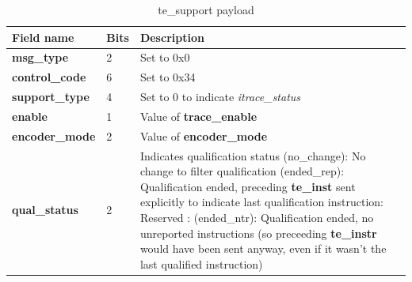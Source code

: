 \begin{table}[!h]
    \centering
    \caption{te\_support payload}
    \label{tab:te_support}
    \begin{tabulary}{\textwidth}{|l|p{8mm}|p{80mm}|}
        \hline
        \textbf {Field name} & \textbf {Bits} & \textbf {Description} \\
        \hline
        \textbf{msg\_type}	& 2	& Set to 0x0\\
        \hline
        \textbf{control\_code} & 6 & Set to 0x34 \\
        \hline
        \textbf{support\_type} & 4 & Set to 0 to indicate \textit{itrace\_status} \\
        \hline
        \textbf{enable} & 1 & Value of \textbf {trace\_enable}\\
        \hline
        \textbf{encoder\_mode} & 2 & Value of \textbf {encoder\_mode}\\
        \hline
        \textbf{qual\_status} & 2 & Indicates qualification status (no\_change): No change to filter qualification  (ended\_rep): Qualification ended, preceding \textbf {te\_inst} sent explicitly to indicate last qualification instruction: Reserved : (ended\_ntr): Qualification ended, no unreported instructions (so preceeding \textbf {te\_instr} would have been sent anyway, even if it wasn't the last qualified instruction)\\
        \hline
    \end{tabulary}
\end{table}
